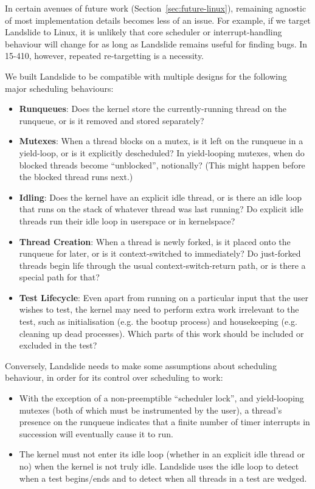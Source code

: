 In certain avenues of future work (Section~\ref{sec:future-linux}), remaining agnostic of most implementation details becomes less of an issue. For example, if we target Landslide to Linux, it is unlikely that core scheduler or interrupt-handling behaviour will change for as long as Landslide remains useful for finding bugs. In 15-410, however, repeated re-targetting is a necessity.

We built Landslide to be compatible with multiple designs for the following major scheduling behaviours:

\begin{itemize}
	\item {\bf Runqueues}: Does the kernel store the currently-running thread on the runqueue, or is it removed and stored separately?
	\item {\bf Mutexes}: When a thread blocks on a mutex, is it left on the runqueue in a yield-loop, or is it explicitly descheduled? In yield-looping mutexes, when do blocked threads become ``unblocked'', notionally? (This might happen before the blocked thread runs next.)
	\item {\bf Idling}: Does the kernel have an explicit idle thread, or is there an idle loop that runs on the stack of whatever thread was last running? Do explicit idle threads run their idle loop in userspace or in kernelspace?
	\item {\bf Thread Creation}: When a thread is newly forked, is it placed onto the runqueue for later, or is it context-switched to immediately? Do just-forked threads begin life through the usual context-switch-return path, or is there a special path for that?
	\item {\bf Test Lifecycle}: Even apart from running on a particular input that the user wishes to test, the kernel may need to perform extra work irrelevant to the test, such as initialisation (e.g. the bootup process) and housekeeping (e.g. cleaning up dead processes). Which parts of this work should be included or excluded in the test?
\end{itemize}

Conversely, Landslide needs to make some assumptions about scheduling behaviour, in order for its control over scheduling to work:

\begin{itemize}
	\item With the exception of a non-preemptible ``scheduler lock'', and yield-looping mutexes (both of which must be instrumented by the user), a thread's presence on the runqueue indicates that a finite number of timer interrupts in succession will eventually cause it to run.
	\item The kernel must not enter its idle loop (whether in an explicit idle thread or no) when the kernel is not truly idle. Landslide uses the idle loop to detect when a test begins/ends and to detect when all threads in a test are wedged.
\end{itemize}
